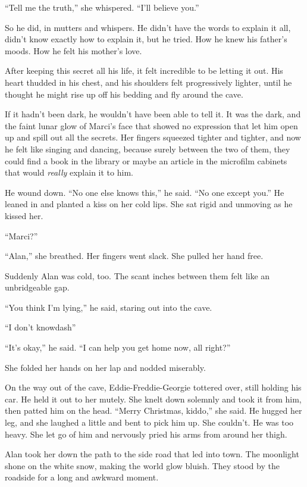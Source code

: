 ``Tell me the truth,'' she whispered.  ``I'll believe you.''

So he did, in mutters and whispers.  He didn't have the words to
explain it all, didn't know exactly how to explain it, but he tried. 
How he knew his father's moods.  How he felt his mother's love.

After keeping this secret all his life, it felt incredible to be
letting it out.  His heart thudded in his chest, and his shoulders
felt progressively lighter, until he thought he might rise up off his
bedding and fly around the cave.

If it hadn't been dark, he wouldn't have been able to tell it.  It was
the dark, and the faint lunar glow of Marci's face that showed no
expression that let him open up and spill out all the secrets.  Her
fingers squeezed tighter and tighter, and now he felt like singing and
dancing, because surely between the two of them, they could find a
book in the library or maybe an article in the microfilm cabinets that
would \textit{really} explain it to him.

He wound down.  ``No one else knows this,'' he said.  ``No one except
you.'' He leaned in and planted a kiss on her cold lips.  She sat
rigid and unmoving as he kissed her.

``Marci?''

``Alan,'' she breathed.  Her fingers went slack.  She pulled her hand
free.

Suddenly Alan was cold, too.  The scant inches between them felt like
an unbridgeable gap.

``You think I'm lying,'' he said, staring out into the cave.

``I don't knowdash{}''

``It's okay,'' he said.  ``I can help you get home now, all right?''

She folded her hands on her lap and nodded miserably.

On the way out of the cave, Eddie-Freddie-Georgie tottered over, still
holding his car.  He held it out to her mutely.  She knelt down
solemnly and took it from him, then patted him on the head.  ``Merry
Christmas, kiddo,'' she said.  He hugged her leg, and she laughed a
little and bent to pick him up.  She couldn't.  He was too heavy.  She
let go of him and nervously pried his arms from around her thigh.

Alan took her down the path to the side road that led into town.  The
moonlight shone on the white snow, making the world glow bluish.  They
stood by the roadside for a long and awkward moment.

